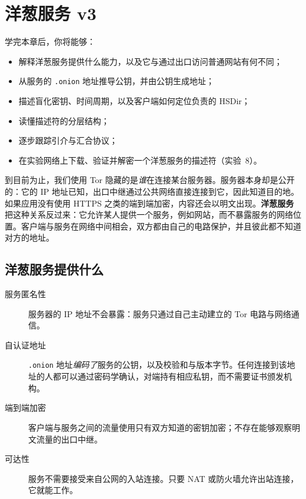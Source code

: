 \chapter{洋葱服务 v3}\label{cap:14-onion-services}

\begin{obiettivi}
学完本章后，你将能够：
\begin{itemize}[nosep]
  \item 解释洋葱服务提供什么能力，以及它与通过出口访问普通网站有何不同；
  \item 从服务的 \texttt{.onion} 地址推导公钥，并由公钥生成地址；
  \item 描述盲化密钥、时间周期，以及客户端如何定位负责的 HSDir；
  \item 读懂描述符的分层结构；
  \item 逐步跟踪引介与汇合协议；
  \item 在实验网络上下载、验证并解密一个洋葱服务的描述符（实验~8）。
\end{itemize}
\end{obiettivi}

到目前为止，我们使用 Tor 隐藏的是\emph{谁}在连接某台服务器。服务器本身却是公开的：它的 IP 地址已知，出口中继通过公共网络直接连接到它，因此知道目的地。如果应用没有使用 HTTPS 之类的端到端加密，内容还会以明文出现。\textbf{洋葱服务}把这种关系反过来：它允许某人提供一个服务，例如网站，而不暴露服务的网络位置。客户端与服务在网络中间相会，双方都由自己的电路保护，并且彼此都不知道对方的地址。

\section{洋葱服务提供什么}\label{sec:os-proprieta}

\begin{description}
  \item[服务匿名性] 服务器的 IP 地址不会暴露：服务只通过自己主动建立的 Tor 电路与网络通信。
  \item[自认证地址] \texttt{.onion} 地址\emph{编码了}服务的公钥，以及校验和与版本字节。任何连接到该地址的人都可以通过密码学确认，对端持有相应私钥，而不需要证书颁发机构。
  \item[端到端加密] 客户端与服务之间的流量使用只有双方知道的密钥加密；不存在能够观察明文流量的出口中继。
  \item[可达性] 服务不需要接受来自公网的入站连接。只要 NAT 或防火墙允许出站连接，它就能工作。
\end{description}

